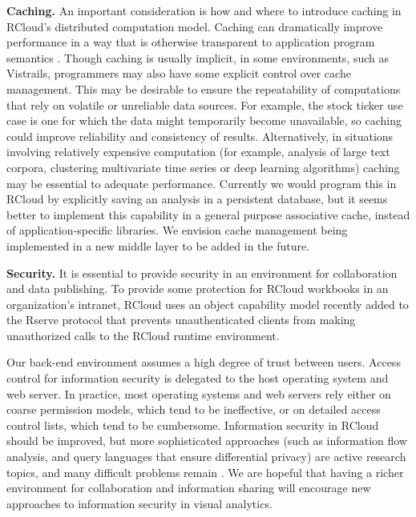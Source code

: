 {\bf Caching.}
An important consideration is how and where to introduce caching
in RCloud's distributed computation model. Caching can dramatically
improve performance in a way that is otherwise transparent to
application program semantics \cite{Callahan:2006:VVM, Guo:2010:TPI}.
Though caching is usually implicit, in some environments, such as
Vistrails, programmers may also have some explicit control over cache
management. This may be desirable to ensure the repeatability of
computations that rely on volatile or unreliable data sources.
For example, the stock ticker use case is one for which the data
might temporarily become unavailable, so caching could improve
reliability and consistency of results. Alternatively, in situations
involving relatively expensive computation (for example, analysis of large
text corpora, clustering multivariate time series or deep learning algorithms)
caching may be essential to adequate performance. Currently we would
program this in RCloud by explicitly saving an analysis in a persistent database,
but it seems better to implement this capability in a general purpose associative
cache, instead of application-specific libraries. We envision cache management
being implemented in a new middle layer to be added in the future.

{\bf Security.}
It is essential to provide security in an environment for
collaboration and data publishing. To provide some
protection for RCloud workbooks in an organization's intranet,
RCloud uses an object capability model
\cite{Miller:2006:RCT}
recently added to the Rserve protocol \cite{Urbanek:2003:AFW}
that prevents unauthenticated clients from making
unauthorized calls to the RCloud runtime environment.

Our back-end environment assumes a high degree of trust between users.
Access control for information security is delegated to the host
operating system and web server. In practice, most operating
systems and web servers rely either on coarse permission models,
which tend to be ineffective, or on detailed access control
lists, which tend to be cumbersome. 
Information security in RCloud should be improved, but more
sophisticated approaches (such as information flow analysis,
and query languages that ensure differential privacy) are
active research topics, and many difficult problems remain
\cite{Moore:2011:SAF}. We are hopeful that having a richer
environment for collaboration and information sharing will encourage
new approaches to information security in visual analytics.
